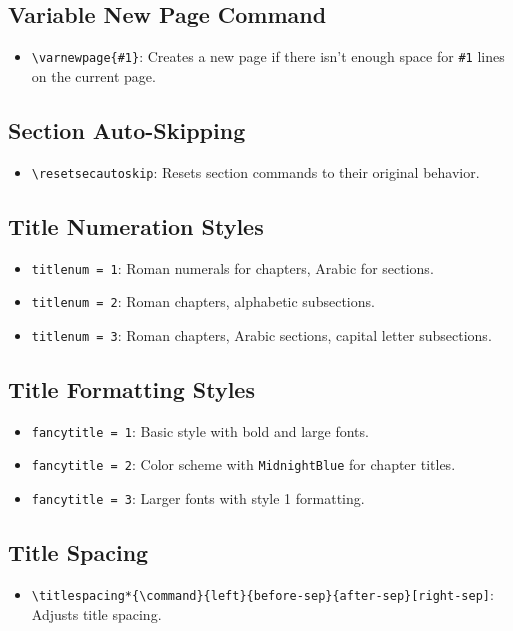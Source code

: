 \documentclass[12pt,twoside]{report}
\begin{document}
\subsection{Variable New Page Command}
\begin{itemize}
    \item \verb|\varnewpage{#1}|: Creates a new page if there isn't enough space for \verb|#1| lines on the current page.
\end{itemize}

\subsection{Section Auto-Skipping}
\begin{itemize}
    \item \verb|\resetsecautoskip|: Resets section commands to their original behavior.
\end{itemize}


\subsection{Title Numeration Styles}
\begin{itemize}
    \item \verb|titlenum = 1|: Roman numerals for chapters, Arabic for sections.
    \item \verb|titlenum = 2|: Roman chapters, alphabetic subsections.
    \item \verb|titlenum = 3|: Roman chapters, Arabic sections, capital letter subsections.
\end{itemize}

\subsection{Title Formatting Styles}
\begin{itemize}
    \item \verb|fancytitle = 1|: Basic style with bold and large fonts.
    \item \verb|fancytitle = 2|: Color scheme with \texttt{MidnightBlue} for chapter titles.
    \item \verb|fancytitle = 3|: Larger fonts with style 1 formatting.
\end{itemize}

\subsection{Title Spacing}
\begin{itemize}
    \item \verb|\titlespacing*{\command}{left}{before-sep}{after-sep}[right-sep]|: Adjusts title spacing.
\end{itemize}
\end{document}
